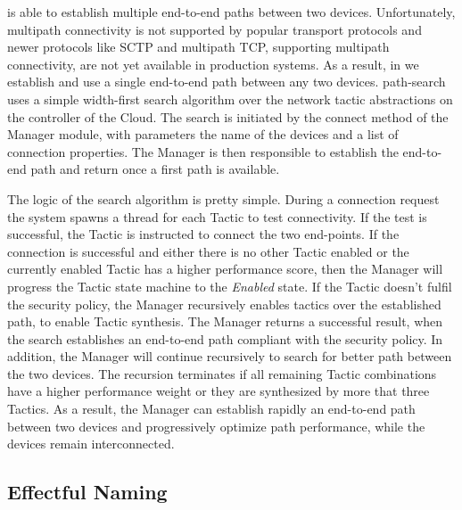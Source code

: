 \signpost is able to establish multiple end-to-end paths between two devices.
Unfortunately, multipath connectivity is not supported by popular transport
protocols and newer protocols like SCTP and multipath TCP, supporting
multipath connectivity, are not yet available in production systems.  
As a result,  in \signpost we establish and use a single
end-to-end path between any two devices.  
\signpost path-search uses a simple width-first search algorithm over the
network tactic abstractions on the controller of the \signpost Cloud. The search
is initiated by the connect method of the Manager module, with parameters the
name of the devices and a list of connection properties. The Manager is then
responsible to establish the end-to-end path and return once a first path is
available. 

The logic of the search algorithm is pretty simple. During a connection request
the system spawns a thread for each Tactic to test connectivity.  If the test is
successful, the Tactic is instructed to connect the two end-points.  If the
connection is successful and either there is no other Tactic enabled or the
currently enabled Tactic has a higher performance score, then the Manager will
progress the Tactic state machine to the {\it Enabled} state. If the Tactic doesn't
fulfil the security policy, the Manager recursively enables tactics over the
established path, to enable Tactic synthesis. The Manager returns a successful
result, when the search establishes an end-to-end path compliant with the
security policy.  In addition, the Manager will continue recursively to search
for better path between the two devices.  The recursion terminates if all
remaining Tactic combinations have a higher performance weight or they are
synthesized by more that three Tactics. As a result, the Manager can establish
rapidly an end-to-end path between two devices and progressively optimize path
performance, while the devices remain interconnected. 

\subsection{Effectful Naming} \label{signpost-naming}

